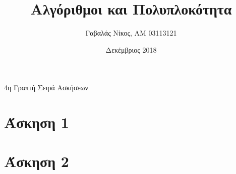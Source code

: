 \documentclass[12pt,a4paper]{article}
\title{Αλγόριθμοι και Πολυπλοκότητα}
\author{Γαβαλάς Νίκος, AM 03113121}
\date{Δεκέμβριος 2018}
\begin{document}
  \maketitle

  \begin{center}
    \Large{4η Γραπτή Σειρά Ασκήσεων}
  \end{center}

  \section{Άσκηση 1}

  \section{Άσκηση 2}
\end{document}
